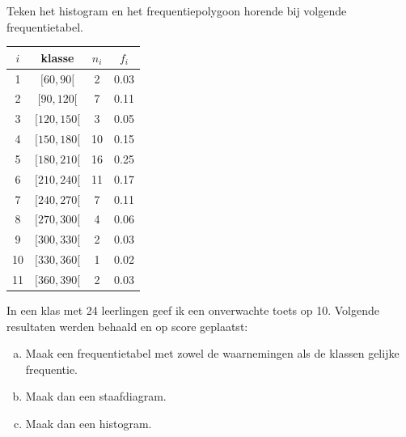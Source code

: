 \documentclass[12pt,twoside,a4paper]{article}
\begin{document}
\begin{oefening}
Teken het histogram en het frequentiepolygoon horende bij volgende frequentietabel.\\
\begin{center}
\begin{tabular}{c|c|c|c}
$i$ & klasse     & $n_i$ & $f_i$\\
\hline
  1 & $[ 60,  90[$ &   2 &  0.03\\
  2 & $[ 90, 120[$ &   7 &  0.11\\
  3 & $[120, 150[$ &   3 &  0.05\\
  4 & $[150, 180[$ &  10 &  0.15\\
  5 & $[180, 210[$ &  16 &  0.25\\
  6 & $[210, 240[$ &  11 &  0.17\\
  7 & $[240, 270[$ &   7 &  0.11\\
  8 & $[270, 300[$ &   4 &  0.06\\
  9 & $[300, 330[$ &   2 &  0.03\\
 10 & $[330, 360[$ &   1 &  0.02\\
 11 & $[360, 390[$ &   2 &  0.03\\
\end{tabular}
\end{center}
\end{oefening}

\begin{oefening}
In een klas met 24 leerlingen geef ik een onverwachte toets op 10. Volgende resultaten werden behaald en op score geplaatst:
\begin{center}
\end{center}
\begin{enumerate}[(a)]
\item Maak een frequentietabel met zowel de waarnemingen als de klassen gelijke frequentie.
\item Maak dan een staafdiagram.
\item Maak dan een histogram.
\end{enumerate}
\end{oefening}
\end{document}

